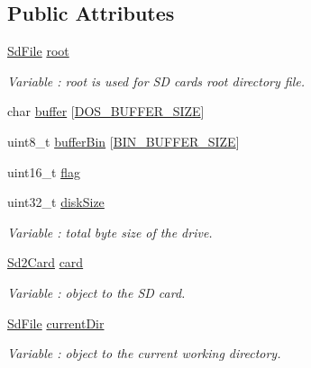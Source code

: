 \subsection*{Public Attributes}
\begin{DoxyCompactItemize}
\item 
\hyperlink{class_sd_file}{Sd\+File} \hyperlink{class_wasp_s_d_a86ed553df7ff5803eeb052c2a5629787}{root}\hypertarget{class_wasp_s_d_a86ed553df7ff5803eeb052c2a5629787}{}\label{class_wasp_s_d_a86ed553df7ff5803eeb052c2a5629787}

\begin{DoxyCompactList}\small\item\em Variable \+: root is used for SD card\textquotesingle{}s root directory file. \end{DoxyCompactList}\item 
char \hyperlink{class_wasp_s_d_ad33b244f29b0473b95e9367895dd0adf}{buffer} \mbox{[}\hyperlink{_wasp_s_d_8h_a360cae4c2a7e6fda1662c344f2da12ba}{D\+O\+S\+\_\+\+B\+U\+F\+F\+E\+R\+\_\+\+S\+I\+ZE}\mbox{]}
\item 
uint8\+\_\+t \hyperlink{class_wasp_s_d_a30858d4ea20d8f577bdda334f9fefaa9}{buffer\+Bin} \mbox{[}\hyperlink{_wasp_s_d_8h_ae0b2e231d682426d06cc13cc79d8a92d}{B\+I\+N\+\_\+\+B\+U\+F\+F\+E\+R\+\_\+\+S\+I\+ZE}\mbox{]}
\item 
uint16\+\_\+t \hyperlink{class_wasp_s_d_a8ca1aac8727a742cddb33e677c71faef}{flag}
\item 
uint32\+\_\+t \hyperlink{class_wasp_s_d_a478bb1b2d91f66cddeb272cfd2c45d1c}{disk\+Size}\hypertarget{class_wasp_s_d_a478bb1b2d91f66cddeb272cfd2c45d1c}{}\label{class_wasp_s_d_a478bb1b2d91f66cddeb272cfd2c45d1c}

\begin{DoxyCompactList}\small\item\em Variable \+: total byte size of the drive. \end{DoxyCompactList}\item 
\hyperlink{class_sd2_card}{Sd2\+Card} \hyperlink{class_wasp_s_d_ada1f923ddbaaeaf0b19a973c6e027949}{card}\hypertarget{class_wasp_s_d_ada1f923ddbaaeaf0b19a973c6e027949}{}\label{class_wasp_s_d_ada1f923ddbaaeaf0b19a973c6e027949}

\begin{DoxyCompactList}\small\item\em Variable \+: object to the SD card. \end{DoxyCompactList}\item 
\hyperlink{class_sd_file}{Sd\+File} \hyperlink{class_wasp_s_d_a8e28451de27ee79fa11812d17060c6b9}{current\+Dir}\hypertarget{class_wasp_s_d_a8e28451de27ee79fa11812d17060c6b9}{}\label{class_wasp_s_d_a8e28451de27ee79fa11812d17060c6b9}

\begin{DoxyCompactList}\small\item\em Variable \+: object to the current working directory. \end{DoxyCompactList}\end{DoxyCompactItemize}


